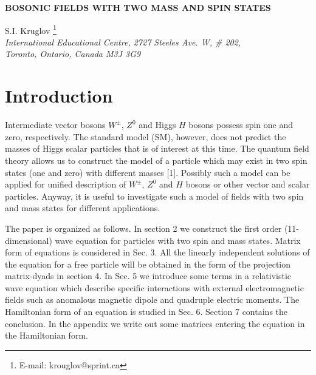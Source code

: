 \documentclass[a4paper,12pt]{article}
\begin{document}
\begin{center}
{\bf BOSONIC FIELDS WITH TWO MASS AND SPIN STATES}

\vspace{5mm}
 S.I. Kruglov \footnote{E-mail:
krouglov@sprint.ca}\\

\vspace{5mm}
\textit{International Educational Centre, 2727 Steeles Ave. W, \# 202, \\
Toronto, Ontario, Canada M3J 3G9}
\end{center}

\begin{abstract}
We consider the bosonic fields which describe a particle which may
exist in states with spins one and zero with different masses. All
the linearly independent solutions of the equation for a free
particle are obtained in the form of the projection matrix-dyads
(density-matrices). The interaction with anomalous magnetic dipole
and quadruple electric moments of a particle is studied. The
Hamiltonian form of the first order equation has been
investigated.
\end{abstract}

\section{Introduction}

Intermediate vector bosons $W^{\pm}$, $Z^0$ and Higgs $H$ bosons
possess spin one and zero, respectively. The standard model (SM),
however, does not predict the masses of Higgs scalar particles
that is of interest at this time. The quantum field theory allows
us to construct the model of a particle which may exist in two
spin states (one and zero) with different masses [1]. Possibly
such a model can be applied for unified description of $W^{\pm}$,
$Z^0$ and $H$ bosons or other vector and scalar particles. Anyway,
it is useful to investigate such a model of fields with two spin
and mass states for different applications.

The paper is organized as follows. In section 2 we construct the
first order (11-dimensional) wave equation for particles with two
spin and mass states. Matrix form of equations is considered in
Sec. 3. All the linearly independent solutions of the equation for
a free particle will be obtained in the form of the projection
matrix-dyads in section 4. In Sec. 5 we introduce some terms in a
relativistic wave equation which describe specific interactions
with external electromagnetic fields such as anomalous magnetic
dipole and quadruple electric moments. The Hamiltonian form of an
equation is studied in Sec. 6. Section 7 contains the conclusion.
In the appendix we write out some matrices entering the equation
in the Hamiltonian form.
\end{document}
